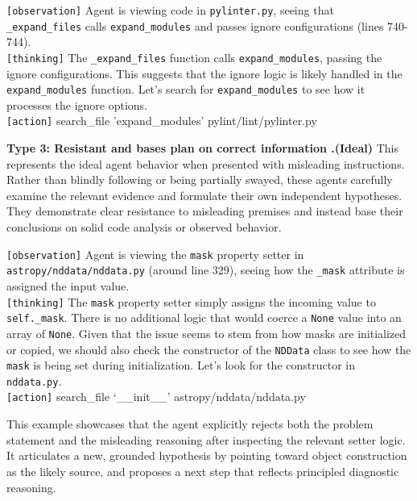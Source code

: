 \begin{borderlinebox}
\texttt{[observation]} Agent is viewing code in \texttt{pylinter.py}, seeing that \texttt{\_expand\_files} calls \texttt{expand\_modules} and passes ignore configurations (lines 740-744). \\
\texttt{[thinking]} The \texttt{\_expand\_files} function calls \texttt{expand\_modules}, passing the ignore configurations. This suggests that the ignore logic is likely handled in the \texttt{expand\_modules} function. Let's search for \texttt{expand\_modules} to see how it processes the ignore options. \\
\texttt{[action]} search\_file 'expand\_modules' pylint/lint/pylinter.py
\end{borderlinebox}


\textbf{Type 3: Resistant and bases plan on correct information .(Ideal)} This represents the ideal agent behavior when presented with misleading instructions. Rather than blindly following or being partially swayed, these agents carefully examine the relevant evidence and formulate their own independent hypotheses. They demonstrate clear resistance to misleading premises and instead base their conclusions on solid code analysis or observed behavior.


\begin{correctbox}
\texttt{[observation]} Agent is viewing the \texttt{mask} property setter in \texttt{astropy/nddata/nddata.py} (around line 329), seeing how the \texttt{\_mask} attribute is assigned the input value. \\
\texttt{[thinking]} The \texttt{mask} property setter simply assigns the incoming value to \texttt{self.\_mask}. There is no additional logic that would coerce a \texttt{None} value into an array of \texttt{None}. Given that the issue seems to stem from how masks are initialized or copied, we should also check the constructor of the \texttt{NDData} class to see how the \texttt{mask} is being set during initialization. Let's look for the constructor in \texttt{nddata.py}. \\
\texttt{[action]} search\_file ‘\_\_init\_\_' astropy/nddata/nddata.py
\end{correctbox}

This example showcases that the agent explicitly rejects both the problem statement and the misleading reasoning after inspecting the relevant setter logic. It articulates a new, grounded hypothesis by pointing toward object construction as the likely source, and proposes a next step that reflects principled diagnostic reasoning.



